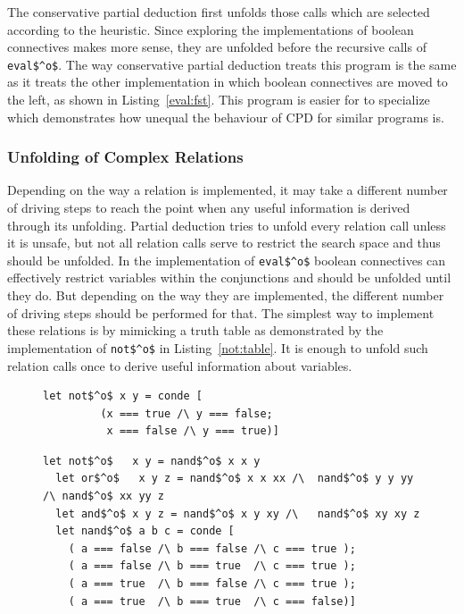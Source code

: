 The conservative partial deduction first unfolds those calls which are selected according to the heuristic.
Since exploring the implementations of boolean connectives makes more sense, they are unfolded before the recursive calls of \lstinline{eval$^o$}.
The way conservative partial deduction treats this program is the same as it treats the other implementation in which boolean connectives
are moved to the left, as shown in Listing~\ref{eval:fst}.
This program is easier for \ecce to specialize which demonstrates how unequal the behaviour of CPD for similar programs is.

\subsubsection{Unfolding of Complex Relations}

Depending on the way a relation is implemented, it may take a different number of driving steps to reach the point when any useful information is derived through its unfolding.
Partial deduction tries to unfold every relation call unless it is unsafe, but not all relation calls serve to restrict the search space and thus should be unfolded.
In the implementation of \lstinline{eval$^o$} boolean connectives can effectively restrict variables within the conjunctions and should be unfolded until they do.
But depending on the way they are implemented, the different number of driving steps should be performed for that.
The simplest way to implement these relations is by mimicking a truth table as demonstrated by the implementation of \lstinline{not$^o$} in Listing~\ref{not:table}.
It is enough to unfold such relation calls once to derive useful information about variables.

\begin{figure}[!t]
  \centering
  \begin{minipage}{0.5\textwidth}
    \begin{lstlisting}[label={not:table}, caption={Implementation of boolean not$^o$ as a table}, captionpos=b, frame=tb]
      let not$^o$ x y = conde [
         (x === true /\ y === false;
          x === false /\ y === true)]
    \end{lstlisting}
  \end{minipage}
  \begin{minipage}{0.8\textwidth}
    \begin{lstlisting}[label={not:nando}, caption={Implementation of boolean operations via nand$^o$}, captionpos=b, frame=tb]
  let not$^o$   x y = nand$^o$ x x y
  let or$^o$   x y z = nand$^o$ x x xx /\  nand$^o$ y y yy /\ nand$^o$ xx yy z
  let and$^o$ x y z = nand$^o$ x y xy /\   nand$^o$ xy xy z
  let nand$^o$ a b c = conde [
    ( a === false /\ b === false /\ c === true );
    ( a === false /\ b === true  /\ c === true );
    ( a === true  /\ b === false /\ c === true );
    ( a === true  /\ b === true  /\ c === false)]
    \end{lstlisting}
  \end{minipage}
\end{figure}

